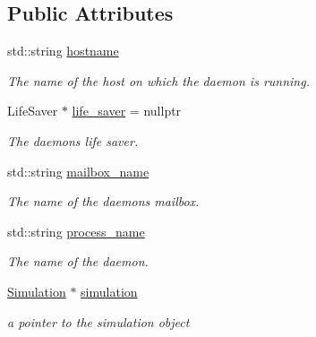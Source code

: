 \subsection*{Public Attributes}
\begin{DoxyCompactItemize}
\item 
\mbox{\label{classwrench_1_1_s4_u___daemon_a52bc0b9a6cd248310749dac086819f00}} 
std\+::string \hyperlink{classwrench_1_1_s4_u___daemon_a52bc0b9a6cd248310749dac086819f00}{hostname}
\begin{DoxyCompactList}\small\item\em The name of the host on which the daemon is running. \end{DoxyCompactList}\item 
\mbox{\label{classwrench_1_1_s4_u___daemon_a225aaf5b49366bbae345266e0046f2e1}} 
Life\+Saver $\ast$ \hyperlink{classwrench_1_1_s4_u___daemon_a225aaf5b49366bbae345266e0046f2e1}{life\+\_\+saver} = nullptr
\begin{DoxyCompactList}\small\item\em The daemon\textquotesingle{}s life saver. \end{DoxyCompactList}\item 
\mbox{\label{classwrench_1_1_s4_u___daemon_af2fd64dbf0d533fa61eacd20b3fead07}} 
std\+::string \hyperlink{classwrench_1_1_s4_u___daemon_af2fd64dbf0d533fa61eacd20b3fead07}{mailbox\+\_\+name}
\begin{DoxyCompactList}\small\item\em The name of the daemon\textquotesingle{}s mailbox. \end{DoxyCompactList}\item 
\mbox{\label{classwrench_1_1_s4_u___daemon_a1d2ace7c5ba85d790b8db6a54d61aeec}} 
std\+::string \hyperlink{classwrench_1_1_s4_u___daemon_a1d2ace7c5ba85d790b8db6a54d61aeec}{process\+\_\+name}
\begin{DoxyCompactList}\small\item\em The name of the daemon. \end{DoxyCompactList}\item 
\mbox{\label{classwrench_1_1_s4_u___daemon_a305beca7ad2fb650ad1492b7c95e93c4}} 
\hyperlink{classwrench_1_1_simulation}{Simulation} $\ast$ \hyperlink{classwrench_1_1_s4_u___daemon_a305beca7ad2fb650ad1492b7c95e93c4}{simulation}
\begin{DoxyCompactList}\small\item\em a pointer to the simulation object \end{DoxyCompactList}\end{DoxyCompactItemize}
